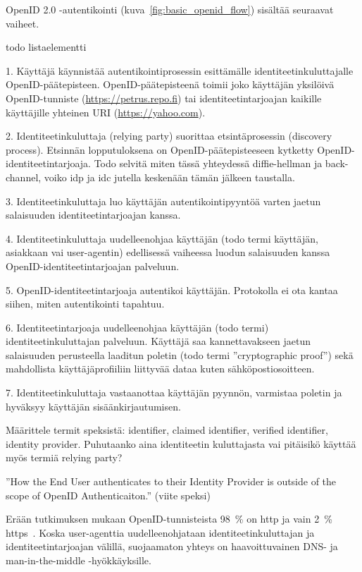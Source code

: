 \documentclass[finnish,gradu]{tktltiki}
\begin{document}
  OpenID 2.0 -autentikointi (kuva~\ref{fig:basic_openid_flow}) sisältää seuraavat vaiheet.

  todo listaelementti

  1. Käyttäjä käynnistää autentikointiprosessin esittämälle identiteetinkuluttajalle OpenID-päätepisteen. OpenID-päätepisteenä toimii joko käyttäjän yksilöivä OpenID-tunniste (\url{https://petrus.repo.fi}) tai identiteetintarjoajan kaikille käyttäjille yhteinen URI (\url{https://yahoo.com}).

  2. Identiteetinkuluttaja (relying party) suorittaa etsintäprosessin (discovery process). Etsinnän lopputuloksena on OpenID-päätepisteeseen kytketty OpenID-identiteetintarjoaja. Todo selvitä miten tässä yhteydessä diffie-hellman ja back-channel, voiko idp ja idc jutella keskenään tämän jälkeen taustalla.

  3. Identiteetinkuluttaja luo käyttäjän autentikointipyyntöä varten jaetun salaisuuden identiteetintarjoajan kanssa.

  4. Identiteetinkuluttaja uudelleenohjaa käyttäjän (todo termi käyttäjän, asiakkaan vai user-agentin) edellisessä vaiheessa luodun salaisuuden kanssa OpenID-identiteetintarjoajan palveluun.

  5. OpenID-identiteetintarjoaja autentikoi käyttäjän. Protokolla ei ota kantaa siihen, miten autentikointi tapahtuu.

  6. Identiteetintarjoaja uudelleenohjaa käyttäjän (todo termi) identiteetinkuluttajan palveluun. Käyttäjä saa kannettavakseen jaetun salaisuuden perusteella laaditun poletin (todo termi ''cryptographic proof'') sekä mahdollista käyttäjäprofiiliin liittyvää dataa kuten sähköpostiosoitteen.

  7. Identiteetinkuluttaja vastaanottaa käyttäjän pyynnön, varmistaa poletin ja hyväksyy käyttäjän sisäänkirjautumisen.


  Määrittele termit speksistä: identifier, claimed identifier, verified identifier, identity provider.
  Puhutaanko aina identiteetin kuluttajasta vai pitäisikö käyttää myös termiä relying party?

  ''How the End User authenticates to their Identity Provider is outside of the scope of OpenID Authenticaiton.'' (viite speksi)

  Erään tutkimuksen mukaan OpenID-tunnisteista 98~\% on http ja vain 2~\% https~\cite{openid_identifier_survey_2011}.
  Koska user-agenttia uudelleenohjataan identiteetinkuluttajan ja identiteetintarjoajan välillä, suojaamaton yhteys on haavoittuvainen DNS- ja man-in-the-middle -hyökkäyksille.
\end{document}
